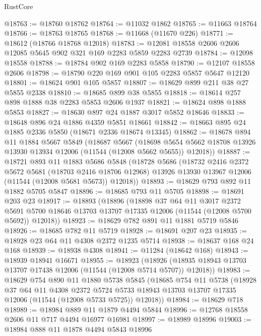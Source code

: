\begin{lexlean}{RustCore}
\begin{coremodule}
@18763 := @18760 @18762
@18764 := @11032 @1862
@18765 := @11663 @18764
@18766 := @18763 @18765
@18768 := @11668 (@11670 @226)
@18771 := @18612 (@18766 @18768 @12018)
@18783 := @12081 @18558 @2606 @2606 @12085 @5645 @902 @321 @169 @2283 @5859 @2283 @2739
@18784 := @12098 @18558
@18788 := @18784 @902 @169 @2283 @5858
@18790 := @12107 @18558 @2606
@18798 := @18790 @220 @169 @901 @105 @2283 @5857 @5647 @12120
@18801 := @18624 @901 @105 @5857
@18807 := @18629 @899 @211 @38 @27 @5855 @2338
@18810 := @18685 @899 @38 @5855
@18818 := @18614 @257 @898 @1888 @38 @2283 @5853 @2606 @1937
@18821 := @18624 @898 @1888 @5853
@18827 := @18630 @897 @24 @1887 @3017 @5852 @18646
@18833 := @18648 @896 @24 @1886 @4359 @5851 @18661
@18842 := @18663 @895 @24 @1885 @2336 @5850 (@18671 @2336 @18674 @13345)
@18862 := @18678
    @894
    @11
    @1884
    @5667
    @5849
    (@18687
      @5667
      (@18698 @5654 @5662 @18708 @13926 @13930 @13934 @12006 (@11544 (@12008 @5662 @5655)) @12018))
@18887 := @18721
    @893
    @11
    @1883
    @5686
    @5848
    (@18728
      @5686
      (@18732
        @2416
        @2372
        @5672
        @5681
        (@18703 @2416 @18706 @12968)
        @13926
        @13930
        @13967
        @12006
        (@11544 (@12008 @5681 @5673))
        @12018))
@18893 := @18629 @793 @892 @11 @1882 @5705 @5847
@18896 := @18685 @793 @11 @5705
@18898 := @18691 @203 @23
@18917 := @18893
    (@18896
      (@18898
        @37
        @64
        @11
        @3017
        @2372
        @5691
        @5700
        @18646
        @13703
        @13707
        @17335
        @12006
        (@11544 (@12008 @5700 @5692))
        @12018))
@18923 := @18629 @782 @891 @11 @1881 @5719 @5846
@18926 := @18685 @782 @11 @5719
@18928 := @18691 @207 @23
@18935 := @18928 @23 @64 @11 @4308 @2372 @1235 @5714
@18938 := @18637 @168 @24 @168
@18939 := @18938 @4308
@18941 := @11284 (@18642 @168)
@18943 := @18939 @18941 @16671
@18955 := @18923
    (@18926 (@18935 @18943 @13703 @13707 @17438 @12006 (@11544 (@12008 @5714 @5707)) @12018))
@18983 := @18629
    @754
    @890
    @11
    @1880
    @5738
    @5845
    (@18685
      @754
      @11
      @5738
      (@18928
        @37
        @64
        @11
        @4308
        @2372
        @5724
        @5733
        @18943
        @13703
        @13707
        @17335
        @12006
        (@11544 (@12008 @5733 @5725))
        @12018))
@18984 := @18629 @718
@18989 := @18984 @889 @11 @1879 @4494 @5844
@18996 := @12768 @18558 @2606 @11 @717 @4494 @16977 @16981
@18997 := @18989 @18996
@19003 := @18984 @888 @11 @1878 @4494 @5843 @18996

\end{coremodule}
\end{lexlean}
